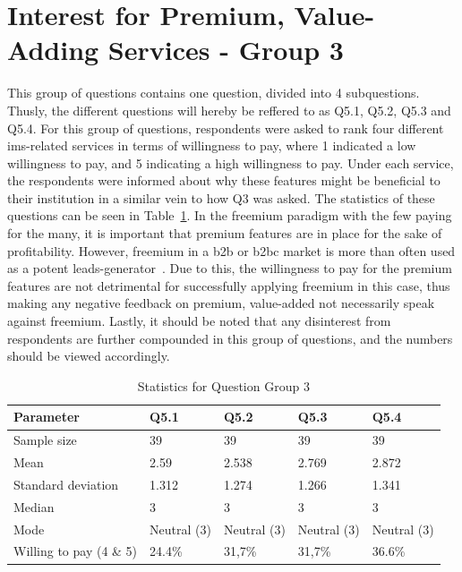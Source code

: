 \section{Interest for Premium, Value-Adding Services - Group 3}
This group of questions contains one question, divided into 4 subquestions. Thusly, the different questions will hereby be reffered to as Q5.1, Q5.2, Q5.3 and Q5.4. For this group of questions, respondents were asked to rank four different \gls{ims}-related services in terms of willingness to pay, where 1 indicated a low willingness to pay, and 5 indicating a high willingness to pay. Under each service, the respondents were informed about why these features might be beneficial to their institution in a similar vein to how Q3 was asked. The statistics of these questions can be seen in Table~\ref{q5stats}. In the freemium paradigm with the few paying for the many, it is important that premium features are in place for the sake of profitability. However, freemium in a \gls{b2b} or \gls{b2bc} market is more than often used as a potent leads-generator~\cite{jepson2009freemium}. Due to this, the willingness to pay for the premium features are not detrimental for successfully applying freemium in this case, thus making any negative feedback on premium, value-added not necessarily speak against freemium. Lastly, it should be noted that any disinterest from respondents are further compounded in this group of questions, and the numbers should be viewed accordingly.

\begin{table}[]
\centering
\caption{Statistics for Question Group 3}
\label{q5stats}
\begin{tabular}{|l|l|l|l|l|}
\hline
\textbf{Parameter} & \textbf{Q5.1} & \textbf{Q5.2} & \textbf{Q5.3} & \textbf{Q5.4} \\ \hline
Sample size        & 39            & 39            & 39            & 39            \\ \hline
Mean               & 2.59          & 2.538         & 2.769         & 2.872         \\ \hline
Standard deviation & 1.312         & 1.274         & 1.266         & 1.341         \\ \hline
Median             & 3             & 3             & 3             & 3             \\ \hline
Mode               & Neutral (3)   & Neutral (3)   & Neutral (3)   & Neutral (3)   \\ \hline
Willing to pay (4 \& 5)               & 24.4\%   & 31,7\% & 31,7\% & 36.6\%   \\ \hline
\end{tabular}
\end{table}


